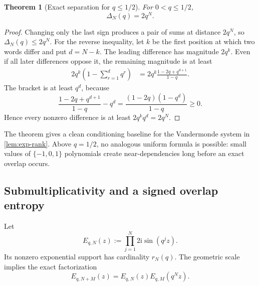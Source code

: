 \documentclass[11pt]{article}
\numberwithin{equation}{section}
\newtheorem{theorem}{Theorem}[section]
\theoremstyle{definition}
\theoremstyle{remark}
\newcommand{\ii}{\mathrm i}
\begin{document}
\begin{theorem}[Exact separation for $q\le1/2$]
\label{thm:exact-separation}
For $0<q\le1/2$,
\begin{equation}
 \boxed{\Delta_N(q)=2q^N.}
 \label{eq:exact-gap}
\end{equation}
\end{theorem}
\begin{proof}
Changing only the last sign produces a pair of sums at distance $2q^N$, so
$\Delta_N(q)\le2q^N$.  For the reverse inequality, let $k$ be the first
position at which two words differ and put $d=N-k$.  The leading difference
has magnitude $2q^k$.  Even if all later differences oppose it, the remaining
magnitude is at least
\begin{align*}
 2q^k\left(1-\sum_{r=1}^{d}q^r\right)
 &=2q^k\frac{1-2q+q^{d+1}}{1-q}.
\end{align*}
The bracket is at least $q^d$, because
\[
 \frac{1-2q+q^{d+1}}{1-q}-q^d
 =\frac{(1-2q)(1-q^d)}{1-q}\ge0.
\]
Hence every nonzero difference is at least $2q^kq^d=2q^N$.
\end{proof}

The theorem gives a clean conditioning baseline for the Vandermonde system in
\cref{lem:exp-rank}.  Above $q=1/2$, no analogous uniform formula is possible:
small values of $\{-1,0,1\}$ polynomials create near-dependencies long before
an exact overlap occurs.

\subsection{Submultiplicativity and a signed overlap entropy}

Let
\begin{equation}
 E_{q,N}(z):=\prod_{j=1}^{N}2\ii\sin(q^jz).
 \label{eq:EqN}
\end{equation}
Its nonzero exponential support has cardinality $r_N(q)$.  The geometric scale
implies the exact factorization
\begin{equation}
 E_{q,N+M}(z)=E_{q,N}(z)E_{q,M}(q^Nz).
 \label{eq:block-factorization}
\end{equation}
\end{document}
